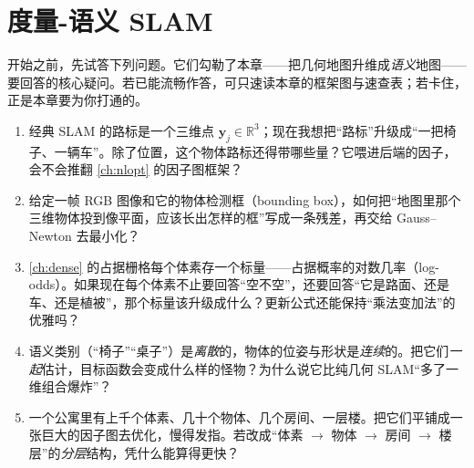 \chapter{度量-语义 SLAM}
\label{ch:semantic}


\begin{practice}[前置自测]
开始之前，先试答下列问题。它们勾勒了本章——把几何地图升维成\emph{语义}地图——要回答的核心疑问。若已能流畅作答，可只速读本章的框架图与速查表；若卡住，正是本章要为你打通的。
\begin{enumerate}
  \item 经典 SLAM 的路标是一个三维点 $\mathbf{y}_j\in\mathbb{R}^3$；现在我想把“路标”升级成“一把椅子、一辆车”。除了位置，这个物体路标还得带哪些量？它喂进后端的因子，会不会推翻 \cref{ch:nlopt} 的因子图框架？
  \item 给定一帧 RGB 图像和它的物体检测框（bounding box），如何把“地图里那个三维物体投到像平面，应该长出怎样的框”写成一条残差，再交给 Gauss--Newton 去最小化？
  \item \cref{ch:dense} 的占据栅格每个体素存一个标量——占据概率的对数几率（log-odds）。如果现在每个体素不止要回答“空不空”，还要回答“它是路面、还是车、还是植被”，那个标量该升级成什么？更新公式还能保持“乘法变加法”的优雅吗？
  \item 语义类别（“椅子”“桌子”）是\emph{离散}的，物体的位姿与形状是\emph{连续}的。把它们\emph{一起}估计，目标函数会变成什么样的怪物？为什么说它比纯几何 SLAM“多了一维组合爆炸”？
  \item 一个公寓里有上千个体素、几十个物体、几个房间、一层楼。把它们平铺成一张巨大的因子图去优化，慢得发指。若改成“体素 $\to$ 物体 $\to$ 房间 $\to$ 楼层”的\emph{分层}结构，凭什么能算得更快？
\end{enumerate}
\end{practice}

